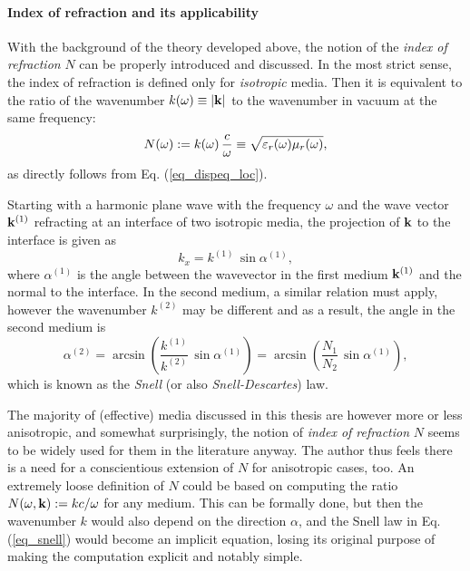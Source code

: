 \paragraph{Index of refraction and its applicability}  %
With the background of the theory developed above, the notion of the \textit{index of refraction} $N$ can be properly introduced and discussed. 
In the most strict sense, the index of refraction is defined only for \textit{isotropic} media. Then it is equivalent to the ratio of the wavenumber $k(\omega) \equiv |{\mathbf{k}}|$ to the wavenumber in vacuum at the same frequency: 
\begin{equation} N(\omega) := k(\omega) \, \frac{c}{\omega} \equiv \sqrt{\varepsilon_r(\omega)\mu_r(\omega)}, \label{eq_dispeqN}\end{equation}
as directly follows from Eq. (\ref{eq_dispeq_loc}).

Starting with a harmonic plane wave with the frequency $\omega$ and the wave vector ${\mathbf{k}}^{(1)}$ refracting at an interface of two isotropic media, the projection of ${\mathbf{k}}$ to the interface is given as 
$$ k_x = k^{(1)}\,\sin \alpha^{(1)}, $$
where $\alpha^{(1)}$ is the angle between the wavevector in the first medium ${\mathbf{k}}^{(1)}$ and the  normal to the interface. In the second medium, a similar relation must apply, however the wavenumber $k^{(2)}$ may be different and as a result, the angle in the second medium is
\begin{equation} \alpha^{(2)} = \arcsin\left( \frac{k^{(1)}}{k^{(2)}} \,\sin \alpha^{(1)} \right) = \arcsin\left( \frac{N_1}{N_2} \,\sin \alpha^{(1)} \right), \label{eq_snell}\end{equation}
which is known as the \textit{Snell} (or also \textit{Snell-Descartes}) law.

The majority of (effective) media discussed in this thesis are however more or less anisotropic, and somewhat surprisingly, the notion of \textit{index of refraction} $N$ seems to be widely used for them in the literature anyway. The author thus feels there is a need for a conscientious extension of $N$ for anisotropic cases, too. An extremely loose definition of $N$ could be based on computing the ratio $N(\omega, {\mathbf{k}}) := kc/\omega$  for any medium. This can be formally done, but then the wavenumber $k$ would also depend on the direction $\alpha$, and the Snell law in Eq. (\ref{eq_snell}) would become an implicit equation, losing its original purpose of making the computation explicit and notably simple.

